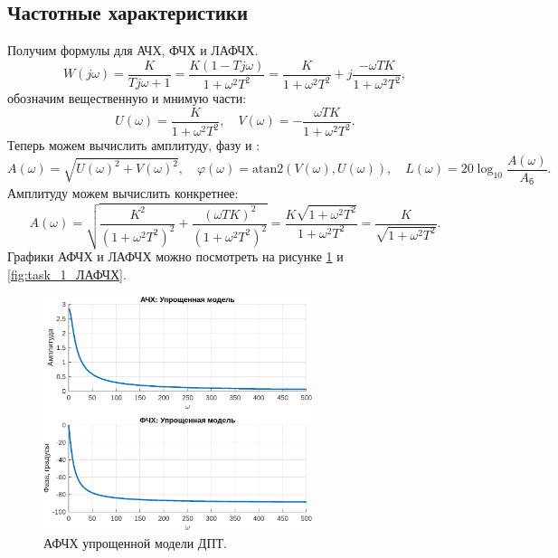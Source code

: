\subsection{Частотные характеристики}

Получим формулы для АЧХ, ФЧХ и ЛАФЧХ.
\begin{equation*}
    W(j\omega)=\frac{K}{Tj\omega + 1}=\frac{K(1-Tj\omega)}{1+\omega^2T^2}
    =\frac{K}{1+\omega^2T^2}+j\frac{-\omega TK}{1+\omega^2T^2},
\end{equation*}
обозначим вещественную и мнимую части:
\begin{equation*}
    U(\omega)=\frac{K}{1+\omega^2T^2},\quad V(\omega)=-\frac{\omega TK}{1+\omega^2T^2}.
\end{equation*}
Теперь можем вычислить амплитуду, фазу и :
\begin{equation*}
    A(\omega)=\sqrt{U(\omega)^2+V(\omega)^2},\quad \varphi(\omega)=\text{atan2}\left( V(\omega), U(\omega) \right),
    \quad L(\omega)=20\log_{10}\frac{A(\omega)}{A_\text{б}}.
\end{equation*}
Амплитуду можем вычислить конкретнее:
\begin{equation*}
    A(\omega)
    =\sqrt{\frac{K^2}{(1+\omega^2T^2)^2}+\frac{(\omega TK)^2}{(1+\omega^2T^2)^2}}
    =\frac{K\sqrt{1+\omega^2T^2}}{1+\omega^2T^2}
    =\frac{K}{\sqrt{1+\omega^2T^2}}.
\end{equation*}
Графики АФЧХ и ЛАФЧХ можно посмотреть на рисунке \ref{fig:task_1_АФЧХ} и \ref{fig:task_1_ЛАФЧХ}.

\begin{figure}[H]
    \centering
    \includegraphics[width=0.7\textwidth]{figs/task_1_АФЧХ.png}
    \caption{АФЧХ упрощенной модели ДПТ.}
    \label{fig:task_1_АФЧХ}
\end{figure}

